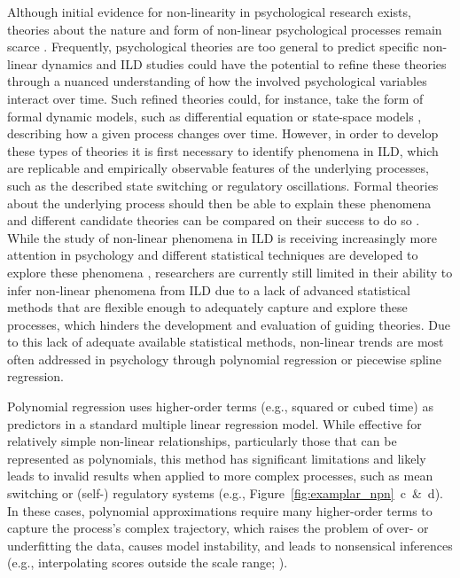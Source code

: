 \documentclass[man, floatsintext]{apa7}
\begin{document}
Although initial evidence for non-linearity in psychological research exists,
theories about the nature and form of non-linear psychological processes remain
scarce \parencite{tan_time-varying_2011}. Frequently, psychological theories
are too general \parencite{oberauer_addressing_2019} to predict specific
non-linear dynamics and ILD studies could have the
potential to refine these theories through a nuanced understanding of how the
involved psychological variables interact over time. Such refined
theories could, for instance, take the form of formal dynamic models, such as
differential equation \parencite{cooper_dynamical_2012} or state-space models
\parencite{durbin_time_2012}, describing how a given process changes over time.
However, in order to develop these types of theories it is first necessary to
identify phenomena in ILD, which are replicable and empirically observable
features of the underlying processes, such as the described state switching or
regulatory oscillations. Formal theories about the underlying process should
then be able to explain these phenomena and different candidate theories can be
compared on their success to do so \parencite{borsboom_theory_2021}. While the
study of non-linear phenomena in ILD is receiving increasingly more attention
in psychology and different statistical techniques are developed to explore
these phenomena \parencite{cui_unlocking_2023,humberg_estimating_2024},
researchers are currently still limited in their ability to infer non-linear
phenomena from ILD due to a lack of advanced statistical methods that are
flexible enough to adequately capture and explore these processes, which
hinders the development and evaluation of guiding theories. Due to this lack of
adequate available statistical methods, non-linear trends are most often
addressed in psychology through polynomial regression or
piecewise spline regression.

Polynomial regression \parencite{jebb_time_2015} uses higher-order terms (e.g.,
squared or cubed time) as predictors in a standard multiple linear regression
model. While effective for relatively simple non-linear relationships,
particularly those that can be represented as polynomials, this method has
significant limitations and likely leads to invalid results when applied to
more complex processes, such as mean switching or (self-) regulatory
systems (e.g., Figure~\ref{fig:examplar_npn}~c~\&~d). In these cases,
polynomial approximations require many higher-order terms to capture the
process's complex trajectory, which raises the problem of over- or underfitting
the data, causes model instability, and leads to nonsensical inferences (e.g.,
interpolating scores outside the scale range;
\textcite{boyd_divergence_2009,harrell_general_2001,jianan_case_2023}).
\end{document}
